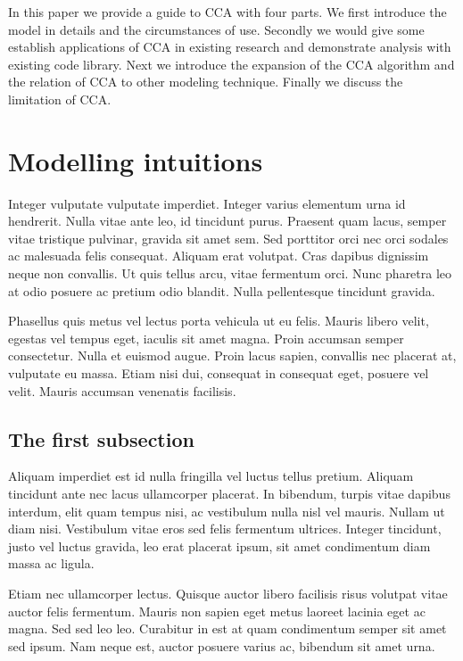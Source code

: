 In this paper we provide a guide to CCA with four parts. We first introduce the model in details and the circumstances of use. Secondly we would give some establish applications of CCA in existing research and demonstrate analysis with existing code library. Next we introduce the expansion of the CCA algorithm and the relation of CCA to other modeling technique. Finally we discuss the limitation of CCA.



\section{Modelling intuitions}
\label{ch2:intuitions}
Integer vulputate vulputate imperdiet. Integer varius elementum urna id hendrerit. Nulla vitae ante leo, id tincidunt purus. Praesent quam lacus, semper vitae tristique pulvinar, gravida sit amet sem. Sed porttitor orci nec orci sodales ac malesuada felis consequat. Aliquam erat volutpat. Cras dapibus dignissim neque non convallis. Ut quis tellus arcu, vitae fermentum orci. Nunc pharetra leo at odio posuere ac pretium odio blandit. Nulla pellentesque tincidunt gravida. 

Phasellus quis metus vel lectus porta vehicula ut eu felis. Mauris libero velit, egestas vel tempus eget, iaculis sit amet magna. Proin accumsan semper consectetur. Nulla et euismod augue. Proin lacus sapien, convallis nec placerat at, vulputate eu massa. Etiam nisi dui, consequat in consequat eget, posuere vel velit. Mauris accumsan venenatis facilisis.

\subsection{The first subsection}
\label{ch2:first:a}
Aliquam imperdiet est id nulla fringilla vel luctus tellus pretium. Aliquam tincidunt ante nec lacus ullamcorper placerat. In bibendum, turpis vitae dapibus interdum, elit quam tempus nisi, ac vestibulum nulla nisl vel mauris. Nullam ut diam nisi. Vestibulum vitae eros sed felis fermentum ultrices. Integer tincidunt, justo vel luctus gravida, leo erat placerat ipsum, sit amet condimentum diam massa ac ligula. 

Etiam nec ullamcorper lectus. Quisque auctor libero facilisis risus volutpat vitae auctor felis fermentum. Mauris non sapien eget metus laoreet lacinia eget ac magna. Sed sed leo leo. Curabitur in est at quam condimentum semper sit amet sed ipsum. Nam neque est, auctor posuere varius ac, bibendum sit amet urna. 

